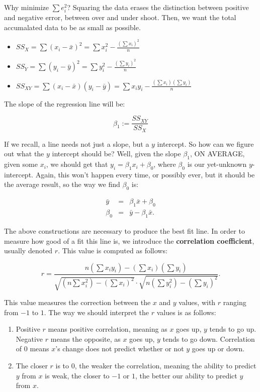 Why minimize $\sum e_i^2$?  Squaring the data erases the distinction between positive and negative error, between  over and under shoot.  Then, we want the total accumalated data to be as small as possible.




\begin{itemize}
\item $SS_X=\sum(x_i-\bar{x})^2=\sum x_i^2-\frac{(\sum x_i)^2}{n}$
\item $SS_Y=\sum(y_i-\bar{y})^2=\sum y_i^2-\frac{(\sum y_i)^2}{n}$
\item $SS_{XY}=\sum(x_i-\bar{x})(y_i-\bar{y})=\sum x_iy_i-\frac{(\sum x_i)(\sum y_i)}{n}$
\end{itemize}

The slope of the regression line will be:

$$\beta_1:=\frac{SS_{XY}}{SS_{X}}$$

If we recall, a line needs not just a slope, but a $y$ intercept.  So how can we figure out what the $y$ intercept should be?  Well, given the slope $\beta_1$, ON AVERAGE, given some $x_i$, we should get that $y_i=\beta_1x_i+\beta_0$, where $\beta_0$ is our yet-unknown $y$-intercept.  Again, this won't happen every time, or possibly ever, but it should be the average result, so the way we find $\beta_0$ is:

\begin{eqnarray*}
\bar{y}&=&\beta_1\bar{x}+\beta_0\\
\beta_0&=&\bar{y}-\beta_1\bar{x}.
\end{eqnarray*}

The above constructions are necessary to produce the best fit line.  In order to measure how good of a fit this line is, we introduce the \textbf{correlation coefficient}, usually denoted $r$.  This value is computed as follows:

$$r=\frac{n(\sum x_iy_i)-(\sum x_i)(\sum y_i)}{\sqrt{(n\sum x_i^2) - (\sum x_i)^2}\cdot \sqrt{n(\sum y_i^2)-(\sum y_i)^2}}.$$

This value measures the correction between the $x$ and $y$ values, with $r$ ranging from $-1$ to $1$.  The way we should interpret the $r$ values is as follows:

\begin{enumerate}
    \item Positive $r$ means positive correlation, meaning as $x$ goes up, $y$ tends to go up.  Negative $r$ means the opposite, as $x$ goes up, $y$ tends to go down.  Correlation of 0 means $x$'s change does not predict whether or not $y$ goes up or down.
    
    \item The closer $r$ is to 0, the weaker the correlation, meaning the ability to predict $y$ from $x$ is weak, the closer to $-1$ or $1$, the better our ability to predict $y$ from $x$.
\end{enumerate}

